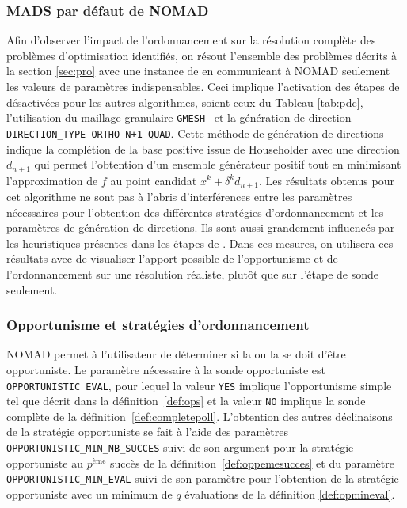 \subsubsection{MADS par défaut de NOMAD}\label{sec:ntr}
Afin d'observer l'impact de l'ordonnancement sur la résolution complète des problèmes d'optimisation identifiés, on résout l'ensemble des problèmes décrits à la section \ref{sec:pro} avec une instance de \MADS en communicant à NOMAD seulement les valeurs de paramètres indispensables. Ceci implique l'activation des étapes de \SEARCH désactivées pour les autres algorithmes, soient ceux du Tableau \ref{tab:pdc}, l'utilisation du maillage granulaire \texttt{GMESH}~\cite{Le09a} et la génération de direction \texttt{DIRECTION\_TYPE ORTHO N+1 QUAD}. Cette méthode de génération de directions indique la complétion de la base positive issue de Householder avec une direction $d_{n+1}$ qui permet l'obtention d'un ensemble générateur positif tout en minimisant l'approximation de $f$ au point candidat $x^k+\delta^k d_{n+1}$.   
Les résultats obtenus pour cet algorithme ne sont pas à l'abris d'interférences entre les paramètres nécessaires pour l'obtention des différentes stratégies d'ordonnancement et les paramètres de génération de directions. Ils sont aussi grandement influencés par les heuristiques présentes dans les étapes de \SEARCH. Dans ces mesures, on utilisera ces résultats avec de visualiser l'apport possible de l'opportunisme et de l'ordonnancement sur une résolution réaliste, plutôt que sur l'étape de sonde seulement.
\subsubsection{Opportunisme et stratégies d'ordonnancement}\label{sec:mop}
NOMAD permet à l'utilisateur de déterminer si la \POLL ou la \SEARCH se doit d'être opportuniste. Le paramètre nécessaire à la sonde opportuniste est \texttt{OPPORTUNISTIC\_EVAL}, pour lequel la valeur \texttt{YES} implique l'opportunisme simple tel que décrit dans la définition~\ref{def:ops} et la valeur \texttt{NO} implique la sonde complète de la définition~\ref{def:completepoll}. L'obtention des autres déclinaisons de la stratégie opportuniste se fait à l'aide des paramètres \texttt{OPPORTUNISTIC\_MIN\_NB\_SUCCES} suivi de son argument pour la stratégie opportuniste au $p^{\text{ème}}$ succès de la définition~\ref{def:oppemesucces} et du paramètre \texttt{OPPORTUNISTIC\_MIN\_EVAL} suivi de son paramètre pour l'obtention de la stratégie opportuniste avec un minimum de $q$ évaluations de la définition \ref{def:opmineval}.

